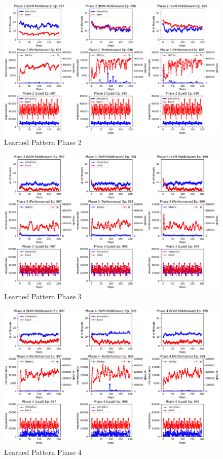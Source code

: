   \begin{figure}[ht]
    \centering
    \includegraphics[width=\textwidth,height=\textheight,keepaspectratio,angle=0]{images/rl_training_phase2.png}
    \caption{Learned Pattern Phase 2}
    \label{fig:learned_phase_2}
  \end{figure}

  \begin{figure}[ht]
    \centering
    \includegraphics[width=\textwidth,height=\textheight,keepaspectratio,angle=0]{images/rl_training_phase3.png}
    \caption{Learned Pattern Phase 3}
    \label{fig:learned_phase_3}
  \end{figure}

  \begin{figure}[ht]
    \centering
    \includegraphics[width=\textwidth,height=\textheight,keepaspectratio,angle=0]{images/rl_training_phase4.png}
    \caption{Learned Pattern Phase 4}
    \label{fig:learned_phase_4}
  \end{figure}